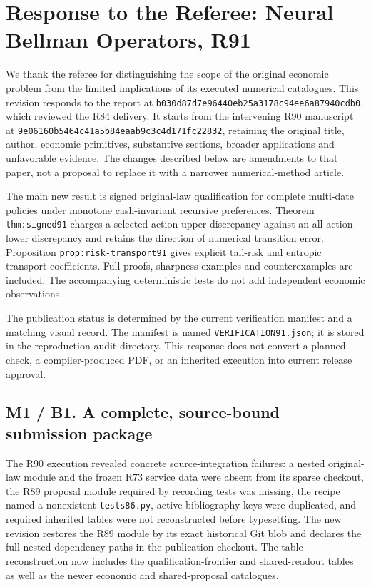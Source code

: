 \hypertarget{response-to-the-referee-neural-bellman-operators-r91}{%
\section{Response to the Referee: Neural Bellman Operators,
R91}\label{response-to-the-referee-neural-bellman-operators-r91}}

We thank the referee for distinguishing the scope of the original
economic problem from the limited implications of its executed numerical
catalogues. This revision responds to the report at
\texttt{b030d87d7e96440eb25a3178c94ee6a87940cdb0}, which reviewed the
R84 delivery. It starts from the intervening R90 manuscript at
\texttt{9e06160b5464c41a5b84eaab9c3c4d171fc22832}, retaining the
original title, author, economic primitives, substantive sections,
broader applications and unfavorable evidence. The changes described
below are amendments to that paper, not a proposal to replace it with a
narrower numerical-method article.

The main new result is signed original-law qualification for complete
multi-date policies under monotone cash-invariant recursive preferences.
Theorem \texttt{thm:signed91} charges a selected-action upper
discrepancy against an all-action lower discrepancy and retains the
direction of numerical transition error. Proposition
\texttt{prop:risk-transport91} gives explicit tail-risk and entropic
transport coefficients. Full proofs, sharpness examples and
counterexamples are included. The accompanying deterministic tests do
not add independent economic observations.

The publication status is determined by the current verification
manifest and a matching visual record. The manifest is named
\texttt{VERIFICATION91.json}; it is stored in the reproduction-audit
directory. This response does not convert a planned check, a
compiler-produced PDF, or an inherited execution into current release
approval.

\hypertarget{m1-b1.-a-complete-source-bound-submission-package}{%
\subsection{M1 / B1. A complete, source-bound submission
package}\label{m1-b1.-a-complete-source-bound-submission-package}}

The R90 execution revealed concrete source-integration failures: a
nested original-law module and the frozen R73 service data were absent
from its sparse checkout, the R89 proposal module required by recording
tests was missing, the recipe named a nonexistent \texttt{tests86.py},
active bibliography keys were duplicated, and required inherited tables
were not reconstructed before typesetting. The new revision restores the
R89 module by its exact historical Git blob and declares the full nested
dependency paths in the publication checkout. The table reconstruction
now includes the qualification-frontier and shared-readout tables as
well as the newer economic and shared-proposal catalogues.


